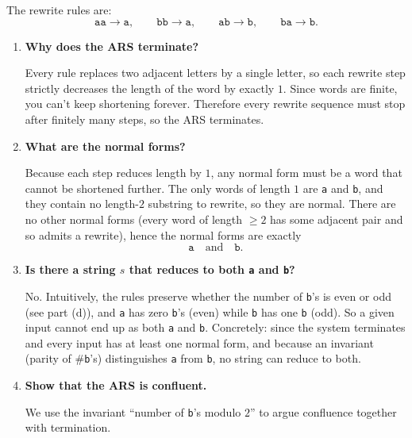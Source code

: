 \documentclass{article}
\theoremstyle{plain}
\theoremstyle{definition}
\theoremstyle{remark}
\begin{document}
The rewrite rules are:
\[
\texttt{aa} \to \texttt{a},\qquad
\texttt{bb} \to \texttt{a},\qquad
\texttt{ab} \to \texttt{b},\qquad
\texttt{ba} \to \texttt{b}.
\]

\begin{enumerate}[label=(\alph*)]
  \item \textbf{Why does the ARS terminate?}
  
  Every rule replaces two adjacent letters by a single letter, so each rewrite step strictly decreases the length of the word by exactly $1$. Since words are finite, you can't keep shortening forever. Therefore every rewrite sequence must stop after finitely many steps, so the ARS terminates.
  
  \item \textbf{What are the normal forms?}
  
  Because each step reduces length by $1$, any normal form must be a word that cannot be shortened further. The only words of length $1$ are \texttt{a} and \texttt{b}, and they contain no length-$2$ substring to rewrite, so they are normal. There are no other normal forms (every word of length $\ge 2$ has some adjacent pair and so admits a rewrite), hence the normal forms are exactly
  \[
    \texttt{a}\quad\text{and}\quad\texttt{b}.
  \]
  
  \item \textbf{Is there a string \(s\) that reduces to both \texttt{a} and \texttt{b}?}
  
  No. Intuitively, the rules preserve whether the number of \texttt{b}'s is even or odd (see part (d)), and \texttt{a} has zero \texttt{b}'s (even) while \texttt{b} has one \texttt{b} (odd). So a given input cannot end up as both \texttt{a} and \texttt{b}. Concretely: since the system terminates and every input has at least one normal form, and because an invariant (parity of \#\texttt{b}'s) distinguishes \texttt{a} from \texttt{b}, no string can reduce to both.
  
  \item \textbf{Show that the ARS is confluent.}
  
  We use the invariant ``number of \texttt{b}'s modulo $2$'' to argue confluence together with termination.
  

\end{enumerate}
\end{document}

